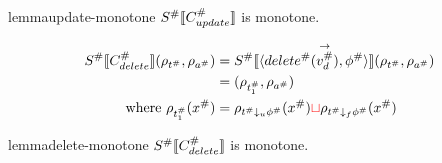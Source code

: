\begin{restatable}{lemma}{update-monotone}
    $S^\# \llbracket C_{update}^\# \rrbracket$ is monotone.
\end{restatable}

\begin{align*}
    S^\# \llbracket C^\#_{delete} \rrbracket(\rho_{t^\#}, \rho_{a^\#})
    &= S^\# \llbracket \langle delete^\#(\overset{\rightarrow}{v_d^\#}), \phi^\# \rangle \rrbracket (\rho_{t^\#}, \rho_{a^\#}) \\
    &= (\rho_{t^\#_1}, \rho_{a^\#}) \\
    \text{where } \rho_{t^\#_1}(x^\#) &= \rho_{t^\# \downarrow_u \phi^\#}(x^\#) \textcolor{red}{\sqcup} \rho_{t^\# \downarrow_f \phi^\#}(x^\#)
\end{align*}

\begin{restatable}{lemma}{delete-monotone}
    $S^\# \llbracket C_{delete}^\# \rrbracket$ is monotone.
\end{restatable}

